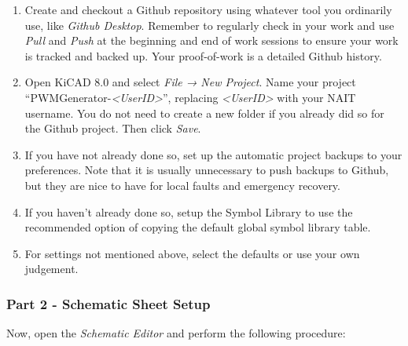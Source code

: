 \documentclass[
  letterpaper,
  DIV=11,
  numbers=noendperiod,
  oneside]{scrartcl}
\begin{document}
\begin{enumerate}
\def\labelenumi{\arabic{enumi}.}
\item
  Create and checkout a Github repository using whatever tool you
  ordinarily use, like \emph{Github Desktop}. Remember to regularly
  check in your work and use \emph{Pull} and \emph{Push} at the
  beginning and end of work sessions to ensure your work is tracked and
  backed up. Your proof-of-work is a detailed Github history.
\item
  Open KiCAD 8.0 and select \emph{File → New Project}. Name your project
  ``PWMGenerator-\emph{\textless UserID\textgreater{}}'', replacing
  \emph{\textless UserID\textgreater{}} with your NAIT username. You do
  not need to create a new folder if you already did so for the Github
  project. Then click \emph{Save}.
\item
  If you have not already done so, set up the automatic project backups
  to your preferences. Note that it is usually unnecessary to push
  backups to Github, but they are nice to have for local faults and
  emergency recovery.
\item
  If you haven't already done so, setup the Symbol Library to use the
  recommended option of copying the default global symbol library table.
\item
  For settings not mentioned above, select the defaults or use your own
  judgement.
\end{enumerate}

\subsubsection{Part 2 - Schematic Sheet
Setup}\label{part-2---schematic-sheet-setup}

Now, open the \emph{Schematic Editor} and perform the following
procedure:
\end{document}
